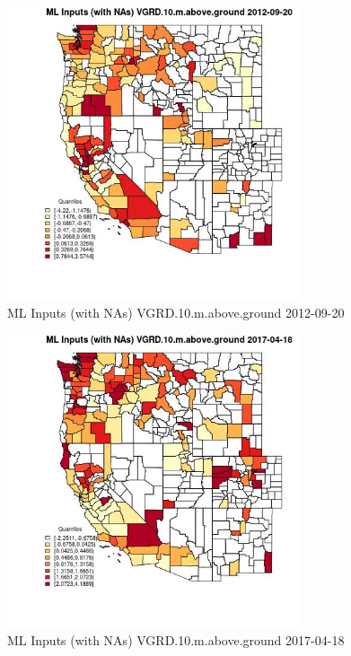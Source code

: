 \begin{figure} 
\centering  
\includegraphics[width=0.77\textwidth]{Code_Outputs/Report_ML_input_PM25_Step4_part_e_de_duplicated_aves_compiled_2019-05-14wNAs_CountyVGRD10mabovegroundMean2012-09-20_2012-09-20.jpg} 
\caption{\label{fig:Report_ML_input_PM25_Step4_part_e_de_duplicated_aves_compiled_2019-05-14wNAsCountyVGRD10mabovegroundMean2012-09-20_2012-09-20}ML Inputs (with NAs) VGRD.10.m.above.ground 2012-09-20} 
\end{figure} 
 

\begin{figure} 
\centering  
\includegraphics[width=0.77\textwidth]{Code_Outputs/Report_ML_input_PM25_Step4_part_e_de_duplicated_aves_compiled_2019-05-14wNAs_CountyVGRD10mabovegroundMean2017-04-18_2017-04-18.jpg} 
\caption{\label{fig:Report_ML_input_PM25_Step4_part_e_de_duplicated_aves_compiled_2019-05-14wNAsCountyVGRD10mabovegroundMean2017-04-18_2017-04-18}ML Inputs (with NAs) VGRD.10.m.above.ground 2017-04-18} 
\end{figure} 
 

